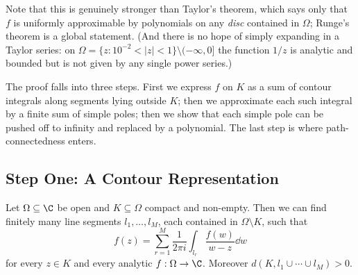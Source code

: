 Note that this is genuinely stronger than Taylor's theorem, which says only that $f$ is uniformly approximable by polynomials on any \emph{disc} contained in $\Omega$; Runge's theorem is a global statement. (And there is no hope of simply expanding in a Taylor series: on $\Omega = \{z : 10^{-2}<|z|<1\}\setminus(-\infty,0]$ the function $1/z$ is analytic and bounded but is not given by any single power series.)

The proof falls into three steps. First we express $f$ on $K$ as a sum of contour integrals along segments lying outside $K$; then we approximate each such integral by a finite sum of simple poles; then we show that each simple pole can be pushed off to infinity and replaced by a polynomial. The last step is where path-connectedness enters.

\subsection{Step One: A Contour Representation}

\begin{lemma}\label{lem:runge-contours}
	Let $\Omega\subseteq\C$ be open and $K\subseteq\Omega$ compact and non-empty. Then we can find finitely many line segments $l_1,\ldots,l_M$, each contained in $\Omega\setminus K$, such that
	$$f(z) = \sum_{r=1}^M\frac{1}{2\pi i}\int_{l_r}\frac{f(w)}{w-z}\dd w$$
	for every $z\in K$ and every analytic $f : \Omega\to\C$. Moreover $d(K, l_1\cup\cdots\cup l_M) > 0$.
\end{lemma}

